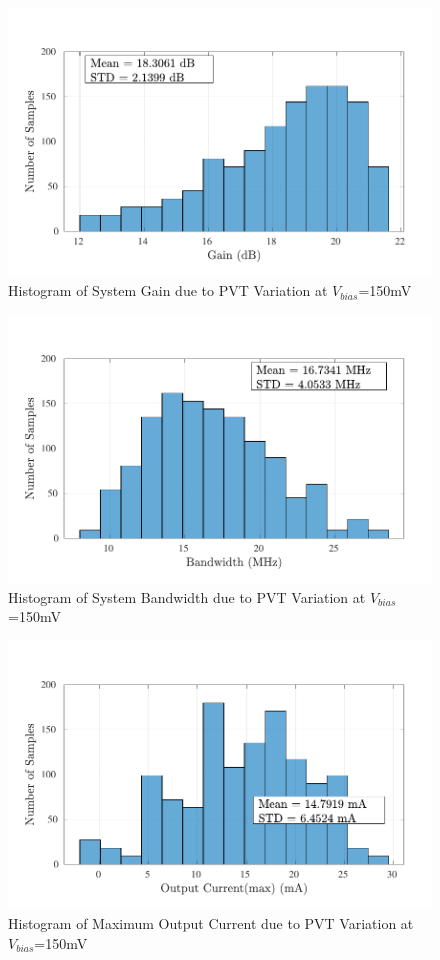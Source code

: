 \begin{figure} [H]
\centering
\includegraphics[scale=1]{Figures/Corners/Overall/PVT_Min/PDFs/PVT_Min_gain.pdf}
\caption{Histogram of System Gain due to PVT Variation at $V_{bias}$=150mV}
\end{figure}

\begin{figure} [H]
\centering
\includegraphics[scale=1]{Figures/Corners/Overall/PVT_Min/PDFs/PVT_Min_bw.pdf}
\caption{Histogram of System Bandwidth due to PVT Variation at $V_{bias}$=150mV}
\end{figure}

\begin{figure} [H]
\centering
\includegraphics[scale=1]{Figures/Corners/Overall/PVT_Min/PDFs/PVT_Min_imax.pdf}
\caption{Histogram of Maximum Output Current due to PVT Variation at $V_{bias}$=150mV}
\end{figure}

